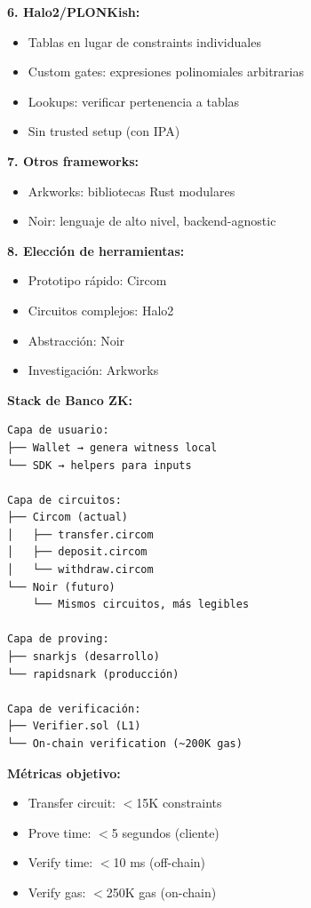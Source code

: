 \documentclass[11pt,a4paper,twoside,openright]{book}
\theoremstyle{definition}
\theoremstyle{plain}
\theoremstyle{remark}
\begin{document}
\begin{keyidea}
\textbf{6. Halo2/PLONKish:}
\begin{itemize}
    \item Tablas en lugar de constraints individuales
    \item Custom gates: expresiones polinomiales arbitrarias
    \item Lookups: verificar pertenencia a tablas
    \item Sin trusted setup (con IPA)
\end{itemize}

\textbf{7. Otros frameworks:}
\begin{itemize}
    \item Arkworks: bibliotecas Rust modulares
    \item Noir: lenguaje de alto nivel, backend-agnostic
\end{itemize}

\textbf{8. Elección de herramientas:}
\begin{itemize}
    \item Prototipo rápido: Circom
    \item Circuitos complejos: Halo2
    \item Abstracción: Noir
    \item Investigación: Arkworks
\end{itemize}
\end{keyidea}

\begin{bancozk}
\textbf{Stack de Banco ZK:}

\begin{verbatim}
Capa de usuario:
├── Wallet → genera witness local
└── SDK → helpers para inputs

Capa de circuitos:
├── Circom (actual)
│   ├── transfer.circom
│   ├── deposit.circom
│   └── withdraw.circom
└── Noir (futuro)
    └── Mismos circuitos, más legibles

Capa de proving:
├── snarkjs (desarrollo)
└── rapidsnark (producción)

Capa de verificación:
├── Verifier.sol (L1)
└── On-chain verification (~200K gas)
\end{verbatim}

\textbf{Métricas objetivo:}
\begin{itemize}
    \item Transfer circuit: $<$15K constraints
    \item Prove time: $<$5 segundos (cliente)
    \item Verify time: $<$10 ms (off-chain)
    \item Verify gas: $<$250K gas (on-chain)
\end{itemize}
\end{bancozk}
\cleardoublepage
\end{document}
